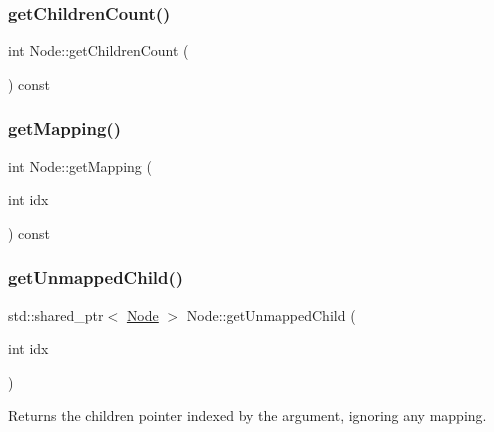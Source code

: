 \mbox{\label{classdtree_1_1_node_a176942c36ed1c832f8f4f4d8c671548e}} 
\subsubsection{\texorpdfstring{getChildrenCount()}{getChildrenCount()}}
{\footnotesize\ttfamily int Node\+::get\+Children\+Count (\begin{DoxyParamCaption}{ }\end{DoxyParamCaption}) const}

\mbox{\label{classdtree_1_1_node_a82bbf8a30241f7e3b61c4bd7774463a6}} 
\subsubsection{\texorpdfstring{getMapping()}{getMapping()}}
{\footnotesize\ttfamily int Node\+::get\+Mapping (\begin{DoxyParamCaption}\item[{int}]{idx }\end{DoxyParamCaption}) const}

\mbox{\label{classdtree_1_1_node_a903fc95c0c0246f7d359dc50e2550e12}} 
\subsubsection{\texorpdfstring{getUnmappedChild()}{getUnmappedChild()}}
{\footnotesize\ttfamily std\+::shared\+\_\+ptr$<$ \mbox{\hyperlink{classdtree_1_1_node}{Node}} $>$ Node\+::get\+Unmapped\+Child (\begin{DoxyParamCaption}\item[{int}]{idx }\end{DoxyParamCaption})}



Returns the children pointer indexed by the argument, ignoring any mapping. 

\mbox{\label{classdtree_1_1_node_a7c96641b47e6b2124c80c346849f182b}} 
